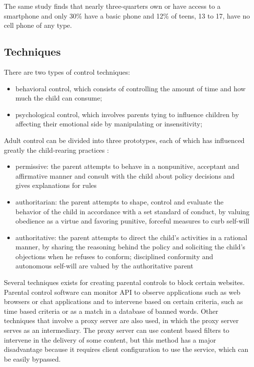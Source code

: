 The same study finds that nearly three-quarters own or have access to a smartphone and only 30\% have a basic phone and 12\% of teens, 13 to 17, have no cell phone of any type.

\subsection{Techniques}

There are two types of control techniques:
\begin{itemize}
\item behavioral control, which consists of controlling the amount of time and how much the child can consume;
\item psychological control, which involves parents tying to influence children by affecting their emotional side by manipulating or insensitivity;
\end{itemize} 

Adult control can be divided into three prototypes, each of which has influenced greatly the child-rearing practices \citep{baumrind1966effects}:

\begin{itemize}
\item permissive: the parent attempts to behave in a nonpunitive, acceptant and affirmative manner and consult with the child about policy decisions and gives explanations for rules
\item authoritarian: the parent attempts to shape, control and evaluate the behavior of the child in accordance with a set standard of conduct, by valuing obedience as a virtue and favoring punitive, forceful measures to curb self-will
\item authoritative: the parent attempts to direct the child's activities in a rational manner, by sharing the reasoning behind the policy and soliciting the child's objections when he refuses to conform; disciplined conformity and autonomous self-will are valued by the authoritative parent
\end{itemize}

Several techniques exists for creating parental controls to block certain websites. Parental control software can monitor API to observe applications such as web browsers or chat applications and to intervene based on certain criteria, such as time based criteria or as a match in a database of banned words. Other techniques that involve a proxy server are also used, in which the proxy server serves as an intermediary. The proxy server can use content based filters to intervene in the delivery of some content, but this method has a major disadvantage because it requires client configuration to use the service, which can be easily bypassed.

